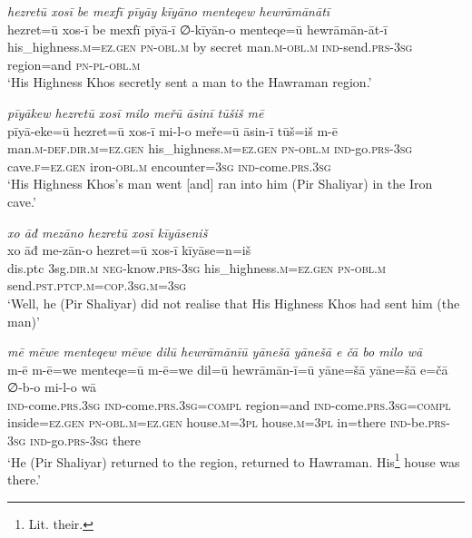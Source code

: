 \ea \label{ŽP.129}
\textit{hezretū xosī be mexfī pīyāy kīyāno menteqew hewrāmānātī} \\ 
\gll hezret=ū xos-ī be mexfī pīyā-ī ∅-kīyān-o menteqe=ū hewrāmān-āt-ī \\ 
 his\_highness\textsc{.m}\textsc{\textsc{=ez.gen}} \textsc{pn}\textsc{-obl}\textsc{.m} by secret man\textsc{.m}\textsc{-obl}\textsc{.m} \textsc{ind-}send\textsc{.prs}\textsc{-3sg} region=and \textsc{pn}\textsc{\textsc{-pl}}\textsc{-obl}\textsc{.m} \\ 
\glt `His Highness Khos secretly sent a man to the Hawraman region.'
\z 
 
\ea \label{ŽP.132}
\textit{pīyākew hezretū xosī milo meřū āsinī tūšiš mē} \\ 
\gll pīyā-eke=ū hezret=ū xos-ī mi-l-o meře=ū āsin-ī tūš=iš m-ē \\ 
 man\textsc{.m}\textsc{-def}\textsc{.dir}\textsc{.m}\textsc{\textsc{=ez.gen}} his\_highness\textsc{.m}\textsc{\textsc{=ez.gen}} \textsc{pn}\textsc{-obl}\textsc{.m} \textsc{ind-}go\textsc{.prs}\textsc{-3sg} cave\textsc{.f}\textsc{\textsc{=ez.gen}} iron\textsc{-obl}\textsc{.m} encounter\textsc{=3sg} \textsc{ind-}come\textsc{.prs}\textsc{.3sg} \\ 
\glt `His Highness Khos’s man went [and] ran into him (Pir Shaliyar) in the Iron cave.'
\z 
 
\ea \label{ŽP.134}
\textit{xo āđ mezāno hezretū xosī kīyāseniš} \\ 
\gll xo āđ me-zān-o hezret=ū xos-ī kīyāse=n=iš \\ 
 dis.ptc 3sg\textsc{.dir}\textsc{.m} \textsc{neg-}know\textsc{.prs}\textsc{-3sg} his\_highness\textsc{.m}\textsc{\textsc{=ez.gen}} \textsc{pn}\textsc{-obl}\textsc{.m} send\textsc{.pst}\textsc{.ptcp}\textsc{.m}\textsc{=cop}\textsc{.3sg}\textsc{.m}\textsc{=3sg} \\ 
\glt `Well, he (Pir Shaliyar) did not realise that His Highness Khos had sent him (the man)'
\z 
 
\ea \label{ŽP.141}
\textit{mē mēwe menteqew mēwe dilū hewrāmānīū yānešā yānešā e čā bo milo wā} \\ 
\gll m-ē m-ē=we menteqe=ū m-ē=we dil=ū hewrāmān-ī=ū yāne=šā yāne=šā e=čā ∅-b-o mi-l-o wā \\ 
 \textsc{ind-}come\textsc{.prs}\textsc{.3sg} \textsc{ind-}come\textsc{.prs}\textsc{.3sg}\textsc{=compl} region=and \textsc{ind-}come\textsc{.prs}\textsc{.3sg}\textsc{=compl} inside\textsc{\textsc{=ez.gen}} \textsc{pn}\textsc{-obl}\textsc{.m}\textsc{\textsc{=ez.gen}} house\textsc{.m}\textsc{=3pl} house\textsc{.m}\textsc{=3pl} in=there \textsc{ind-}be\textsc{.prs}\textsc{-3sg} \textsc{ind-}go\textsc{.prs}\textsc{-3sg} there \\ 
\glt `He (Pir Shaliyar) returned to the region, returned to Hawraman. His\footnote{Lit. their.} house was there.'
\z 
 
